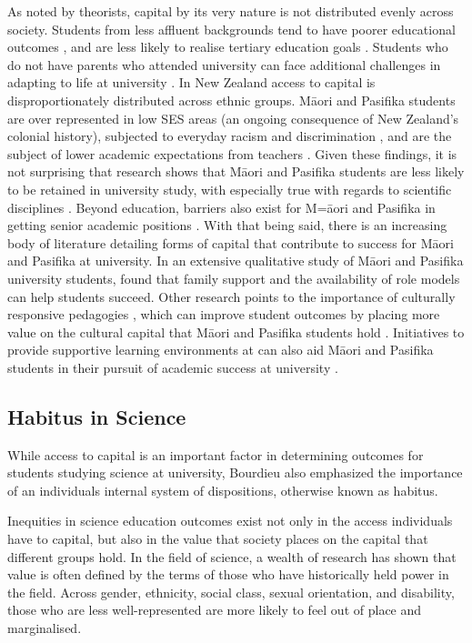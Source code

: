 As noted by theorists, capital by its very nature is not distributed evenly across society. Students from less affluent backgrounds tend to have poorer educational outcomes \cite{May_2016}, and are less likely to realise tertiary education goals \cite{reynolds2011change}. Students who do not have parents who attended university can face additional challenges in adapting to life at university . In New Zealand access to capital is disproportionately distributed across ethnic groups. M\={a}ori and Pasifika students are over represented in low SES areas (an ongoing consequence of New Zealand's colonial history), subjected to everyday racism and discrimination \citep{mayeda2014you}, and are the subject of lower academic expectations from teachers \citep{turner2015teacher}. Given these findings, it is not surprising that research shows that M\={a}ori and Pasifika students are less likely to be retained in university study, with especially true with regards to scientific disciplines \cite{EducationCounts_2019}. Beyond education, barriers also exist for M=\={a}ori and Pasifika in getting senior academic positions \cite{mcallister2019isn,naepi2019isn}. With that being said, there is an increasing body of literature detailing forms of capital that contribute to success for M\={a}ori and Pasifika at university. In an extensive qualitative study of M\={a}ori and Pasifika university students, \citep{mayeda2014you} found that family support and the availability of role models can help students succeed. Other research points to the importance of culturally responsive pedagogies \citep{glynn2010culturally}, which can improve student outcomes by placing more value on the cultural capital that M\={a}ori and Pasifika students hold \cite{bishop2009te}. Initiatives to provide supportive learning environments at can also aid M\={a}ori and Pasifika students in their pursuit of academic success at university \cite{wilson2011awhina}. 

\subsection{Habitus in Science}
While access to capital is an important factor in determining outcomes for students studying science at university, Bourdieu also emphasized the importance of an individuals internal system of dispositions, otherwise known as habitus. 

Inequities in science education outcomes exist not only in the access individuals have to capital, but also in the value that society places on the capital that different groups hold. In the field of science, a wealth of research has shown that value is often defined by the terms of those who have historically held power in the field. Across gender, ethnicity, social class, sexual orientation, and disability, those who are less well-represented are more likely to feel out of place and marginalised. 

